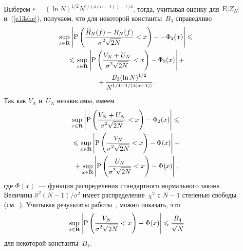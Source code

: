 \begin{multicols}{2}
\begin{multline*}
\end{multline*}
Выберем $\varepsilon=(\ln N)^{1/2}N^{1/(4(\alpha+1))-1/4}$, тогда, учитывая оценку для~$\mbox{E}|Z_N|$ 
и~(\ref{e13she}), получаем, что для некоторой константы~$B_3$ справедливо
\begin{multline}
\sup\limits_{x\in\mathbf{R}}\left\vert\mbox{P}\left(\displaystyle\frac{\displaystyle \widehat{R}_N(f)-R_N(f)\mathstrut}{\displaystyle \sigma^2\sqrt{2N}\mathstrut}<x\right)-
-\Phi_2(x)\right\vert\leqslant{}\\
{}\leqslant \sup\limits_{x\in\mathbf{R}}\left\vert\mbox{P}\left(\displaystyle\frac{\displaystyle V_N+U_N\mathstrut}{\displaystyle \sigma^2\sqrt{2N}\mathstrut}<x\right)-\Phi_2(x)\right\vert+{}\\
{}+
\displaystyle\frac{\displaystyle B_3(\ln N)^{1/2}\mathstrut}{\displaystyle N^{1/4-1/(4(\alpha+1))}\mathstrut}\,.
\label{e14she}
\end{multline}
Так как $V_N$ и~$U_N$ независимы, имеем~\cite{13she}
\begin{multline}
\sup\limits_{x\in\mathbf{R}}\left\vert\mbox{P}\left(\displaystyle\frac{\displaystyle V_N+U_N\mathstrut}{\displaystyle \sigma^2\sqrt{2N}\mathstrut}<x\right)-\Phi_2(x)\right\vert\leqslant{}\\
{}\leqslant\sup\limits_{x\in\mathbf{R}}\left\vert\mbox{P}\left(\displaystyle\frac{\displaystyle V_N\mathstrut}{\displaystyle \sigma^2\sqrt{2N}\mathstrut}<x\right)-
\Phi(x)\right\vert+{}\\
{}+\sup\limits_{x\in\mathbf{R}}\left\vert\mbox{P}\left(\displaystyle\frac{\displaystyle U_N\mathstrut}{\displaystyle \sigma^2\sqrt{2N}\mathstrut}<x\right)-\Phi(x)\right\vert\,,
\label{e15she}
\end{multline}
где $\Phi(x)$~--- функция распределения стандартного нормального закона.
Величина $\hat{\sigma}^2(N-1)/\sigma^2$ имеет распределение~$\chi^2$ с $N-1$ степенью свободы (см.~\cite{12she}). 
Учитывая результаты работы~\cite{14she}, можно показать, что
\begin{equation}
\sup\limits_{x\in\mathbf{R}}\left\vert\mbox{P}\left(\displaystyle\frac{\displaystyle V_N\mathstrut}{\displaystyle \sigma^2\sqrt{2N}\mathstrut}<x\right)-\Phi(x)\right\vert
\leqslant\displaystyle\frac{\displaystyle B_4\mathstrut}{\displaystyle \sqrt{N}\mathstrut}
\label{e16she}
\end{equation}
для некоторой константы~$B_4$.

\pagebreak


\end{multicols}
